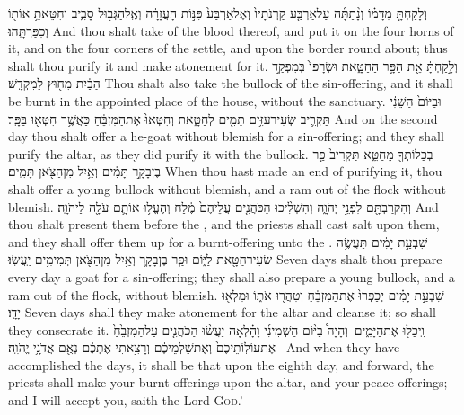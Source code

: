 {וְלָקַחְתָּ֣ מִדָּמ֗וֹ וְנָ֨תַתָּ֜ה עַל\maqqaf אַרְבַּ֤ע קַרְנֹתָיו֙ וְאֶל\maqqaf אַרְבַּע֙ פִּנּ֣וֹת הָעֲזָרָ֔ה וְאֶֽל\maqqaf הַגְּב֖וּל סָבִ֑יב וְחִטֵּאתָ֥ אוֹת֖וֹ וְכִפַּרְתָּֽהוּ׃}
{And thou shalt take of the blood thereof, and put it on the four horns of it, and on the four corners of the settle, and upon the border round about; thus shalt thou purify it and make atonement for it.}
{וְלָ֣קַחְתָּ֔ אֵ֖ת הַפָּ֣ר הַחַטָּ֑את וּשְׂרָפוֹ֙ בְּמִפְקַ֣ד הַבַּ֔יִת מִח֖וּץ לַמִּקְדָּֽשׁ׃}
{Thou shalt also take the bullock of the sin-offering, and it shall be burnt in the appointed place of the house, without the sanctuary.}
{וּבַיּוֹם֙ הַשֵּׁנִ֔י תַּקְרִ֛יב שְׂעִיר\maqqaf עִזִּ֥ים תָּמִ֖ים לְחַטָּ֑את וְחִטְּאוּ֙ אֶת\maqqaf הַמִּזְבֵּ֔חַ כַּאֲשֶׁ֥ר חִטְּא֖וּ בַּפָּֽר׃}
{And on the second day thou shalt offer a he-goat without blemish for a sin-offering; and they shall purify the altar, as they did purify it with the bullock.}
{בְּכַלּוֹתְךָ֖ מֵחַטֵּ֑א תַּקְרִיב֙ פַּ֣ר בֶּן\maqqaf בָּקָ֣ר תָּמִ֔ים וְאַ֥יִל מִן\maqqaf הַצֹּ֖אן תָּמִֽים׃}
{When thou hast made an end of purifying it, thou shalt offer a young bullock without blemish, and a ram out of the flock without blemish.}
{וְהִקְרַבְתָּ֖ם לִפְנֵ֣י יְהֹוָ֑ה וְהִשְׁלִ֨יכוּ הַכֹּהֲנִ֤ים עֲלֵיהֶם֙ מֶ֔לַח וְהֶעֱל֥וּ אוֹתָ֛ם עֹלָ֖ה לַיהֹוָֽה׃}
{And thou shalt present them before the \lord, and the priests shall cast salt upon them, and they shall offer them up for a burnt-offering unto the \lord.}
{שִׁבְעַ֣ת יָמִ֔ים תַּעֲשֶׂ֥ה שְׂעִיר\maqqaf חַטָּ֖את לַיּ֑וֹם וּפַ֧ר בֶּן\maqqaf בָּקָ֛ר וְאַ֥יִל מִן\maqqaf הַצֹּ֖אן תְּמִימִ֥ים יַֽעֲשֽׂוּ׃}
{Seven days shalt thou prepare every day a goat for a sin-offering; they shall also prepare a young bullock, and a ram out of the flock, without blemish.}
{שִׁבְעַ֣ת יָמִ֗ים יְכַפְּרוּ֙ אֶת\maqqaf הַמִּזְבֵּ֔חַ וְטִהֲר֖וּ אֹת֑וֹ וּמִלְא֖וּ יָדָֽו׃}
{Seven days shall they make atonement for the altar and cleanse it; so shall they consecrate it.}
{וִֽיכַלּ֖וּ אֶת\maqqaf הַיָּמִ֑ים \setuma  וְהָיָה֩ בַיּ֨וֹם הַשְּׁמִינִ֜י וָהָ֗לְאָה יַעֲשׂ֨וּ הַכֹּהֲנִ֤ים עַל\maqqaf הַמִּזְבֵּ֙חַ֙ אֶת\maqqaf עוֹלֽוֹתֵיכֶם֙ וְאֶת\maqqaf שַׁלְמֵיכֶ֔ם וְרָצִ֣אתִי אֶתְכֶ֔ם נְאֻ֖ם אֲדֹנָ֥י יֱהֹוִֽה׃ \setuma }
{And when they have accomplished the days, it shall be that upon the eighth day, and forward, the priests shall make your burnt-offerings upon the altar, and your peace-offerings; and I will accept you, saith the Lord \textsc{God}.’}
